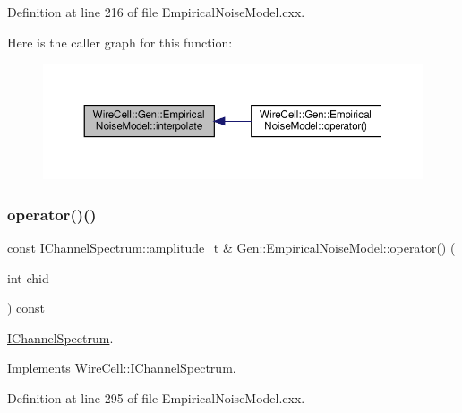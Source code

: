 Definition at line 216 of file Empirical\+Noise\+Model.\+cxx.

Here is the caller graph for this function\+:
\nopagebreak
\begin{figure}[H]
\begin{center}
\leavevmode
\includegraphics[width=350pt]{class_wire_cell_1_1_gen_1_1_empirical_noise_model_a5b1d7a97da1b07237cf03b28a2caacdf_icgraph}
\end{center}
\end{figure}
\mbox{\label{class_wire_cell_1_1_gen_1_1_empirical_noise_model_a9ed3c28256c1c262064c62816b4b225f}} 
\subsubsection{\texorpdfstring{operator()()}{operator()()}}
{\footnotesize\ttfamily const \hyperlink{class_wire_cell_1_1_i_channel_spectrum_a9af7bfed961f49dc8a532fd5d0bf3e6e}{I\+Channel\+Spectrum\+::amplitude\+\_\+t} \& Gen\+::\+Empirical\+Noise\+Model\+::operator() (\begin{DoxyParamCaption}\item[{int}]{chid }\end{DoxyParamCaption}) const\hspace{0.3cm}{\ttfamily [virtual]}}



\hyperlink{class_wire_cell_1_1_i_channel_spectrum}{I\+Channel\+Spectrum}. 



Implements \hyperlink{class_wire_cell_1_1_i_channel_spectrum_a587c11bd2e39e3136b1b60268d22bf9f}{Wire\+Cell\+::\+I\+Channel\+Spectrum}.



Definition at line 295 of file Empirical\+Noise\+Model.\+cxx.

